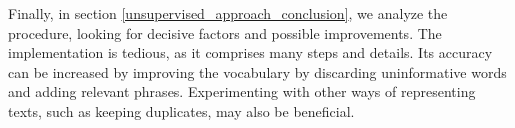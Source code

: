 Finally, in section \ref{unsupervised_approach_conclusion}, we analyze the procedure, looking for decisive factors and possible improvements. The implementation is tedious, as it comprises many steps and details. Its accuracy can be increased by improving the vocabulary by discarding uninformative words and adding relevant phrases. Experimenting with other ways of representing texts, such as keeping duplicates, may also be beneficial.






